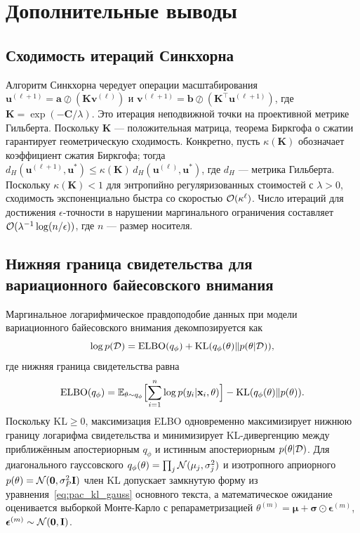 \section{Дополнительные выводы}
\label{app:additional}

\subsection{Сходимость итераций Синкхорна}
\label{app:sinkhorn}

Алгоритм Синкхорна чередует операции масштабирования $\mathbf{u}^{(\ell+1)}=\mathbf{a}\oslash(\mathbf{K}\mathbf{v}^{(\ell)})$ и $\mathbf{v}^{(\ell+1)}=\mathbf{b}\oslash(\mathbf{K}^\top\mathbf{u}^{(\ell+1)})$, где $\mathbf{K}=\exp(-\mathbf{C}/\lambda)$. Это итерация неподвижной точки на проективной метрике Гильберта. Поскольку $\mathbf{K}$ --- положительная матрица, теорема Биркгофа о сжатии гарантирует геометрическую сходимость. Конкретно, пусть $\kappa(\mathbf{K})$ обозначает коэффициент сжатия Биркгофа; тогда $d_H(\mathbf{u}^{(\ell+1)},\mathbf{u}^*)\le\kappa(\mathbf{K})\,d_H(\mathbf{u}^{(\ell)},\mathbf{u}^*)$, где $d_H$ --- метрика Гильберта. Поскольку $\kappa(\mathbf{K})<1$ для энтропийно регуляризованных стоимостей с $\lambda>0$, сходимость экспоненциально быстра со скоростью $\mathcal{O}(\kappa^{\ell})$. Число итераций для достижения $\epsilon$-точности в нарушении маргинального ограничения составляет $\mathcal{O}(\lambda^{-1}\log(n/\epsilon))$, где $n$ --- размер носителя.


\subsection{Нижняя граница свидетельства для вариационного байесовского внимания}
\label{app:elbo}

Маргинальное логарифмическое правдоподобие данных при модели вариационного байесовского внимания декомпозируется как
\begin{equation}
\log p(\mathcal{D}) = \mathrm{ELBO}(q_\phi) + \mathrm{KL}(q_\phi(\theta)\|p(\theta|\mathcal{D})),
\end{equation}
где нижняя граница свидетельства равна
\begin{equation}
\mathrm{ELBO}(q_\phi) = \mathbb{E}_{\theta\sim q_\phi}\Bigl[\sum_{i=1}^n\log p(y_i|\mathbf{x}_i,\theta)\Bigr] - \mathrm{KL}(q_\phi(\theta)\|p(\theta)).
\end{equation}
Поскольку $\mathrm{KL}\ge 0$, максимизация ELBO одновременно максимизирует нижнюю границу логарифма свидетельства и минимизирует KL-дивергенцию между приближённым апостериорным $q_\phi$ и истинным апостериорным $p(\theta|\mathcal{D})$. Для диагонального гауссовского $q_\phi(\theta)=\prod_j\mathcal{N}(\mu_j,\sigma_j^2)$ и изотропного априорного $p(\theta)=\mathcal{N}(\mathbf{0},\sigma_P^2\mathbf{I})$ член KL допускает замкнутую форму из уравнения~\eqref{eq:pac_kl_gauss} основного текста, а математическое ожидание оценивается выборкой Монте-Карло с репараметризацией $\theta^{(m)}=\bm{\mu}+\bm{\sigma}\odot\bm{\epsilon}^{(m)}$, $\bm{\epsilon}^{(m)}\sim\mathcal{N}(\mathbf{0},\mathbf{I})$.


